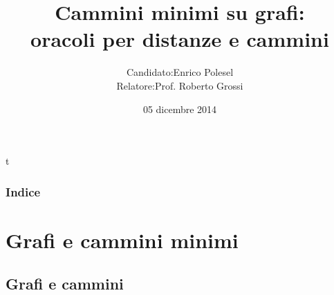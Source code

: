 t \documentclass{beamer}
\theoremstyle{plain}
\theoremstyle{definition}
\theoremstyle{remark}
\begin{document}
\title[Oracoli per cammini e distanze]{Cammini minimi su grafi:\\
  oracoli per distanze e cammini}
\date{05 dicembre 2014}

\author[Enrico Polesel]{\begin{tabular}{r@{ }l}
Candidato: &  Enrico Polesel \\ 
Relatore: & Prof. Roberto Grossi
\end{tabular}
}



\begin{frame}[plain]
  \titlepage
\end{frame}

\begin{frame}[plain]
 \frametitle{Indice}
 \tableofcontents
\end{frame}




\AtBeginSubsection[]
{
  \begin{frame}[plain]{\secname $\rightarrow$ \subsecname}
    \tableofcontents[currentsubsection]
  \end{frame}
}


\section{Grafi e cammini minimi}

\subsection{Grafi e cammini}
\end{document}

